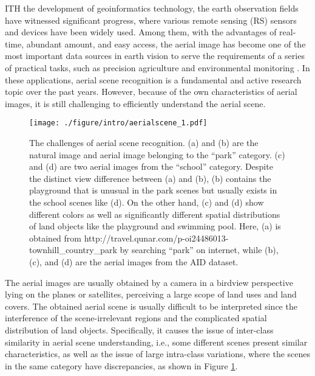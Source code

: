 \documentclass[10pt, journal,twoside]{IEEEtran}
\begin{document}
ITH the development of geoinformatics technology, the earth observation fields have witnessed significant progress, where various remote sensing (RS) sensors and devices have been widely used. Among them, with the advantages of real-time, abundant amount, and easy access, the aerial image has become one of the most important data sources in earth vision to serve the requirements of a series of practical tasks, such as precision agriculture \cite{agriculture_1,zhang2020empowering} and environmental monitoring \cite{env_monit_1}. In these applications, aerial scene recognition is a fundamental and active research topic over the past years. However, because of the own characteristics of aerial images, it is still challenging to efficiently understand the aerial scene.


\begin{figure}[t]
  \centering
  \texttt{[image: ./figure/intro/aerialscene\_1.pdf]}\\
  \caption{
  The challenges of aerial scene recognition. (a) and (b) are the natural image and aerial image belonging to the ``park'' category. (c) and (d) are two aerial images from the ``school'' category. Despite the distinct view difference between (a) and (b), (b) contains the playground that is unusual in the park scenes but usually exists in the school scenes like (d). On the other hand, (c) and (d) show different colors as well as significantly different spatial distributions of land objects like the playground and swimming pool. Here, (a) is obtained from http://travel.qunar.com/p-oi24486013-townhill\_country\_park by searching ``park'' on internet, while (b), (c), and (d) are the aerial images from the AID dataset.
  }
  \label{aerialscene}
\end{figure}

The aerial images are usually obtained by a camera in a birdview perspective lying on the planes or satellites, perceiving a large scope of land uses and land covers. The obtained aerial scene is usually difficult to be interpreted since the interference of the scene-irrelevant regions and the complicated spatial distribution of land objects. Specifically, it causes the issue of inter-class similarity in aerial scene understanding, i.e., some different scenes present similar characteristics, as well as the issue of large intra-class variations, where the scenes in the same category have discrepancies, as shown in Figure \ref{aerialscene}.
\end{document}
